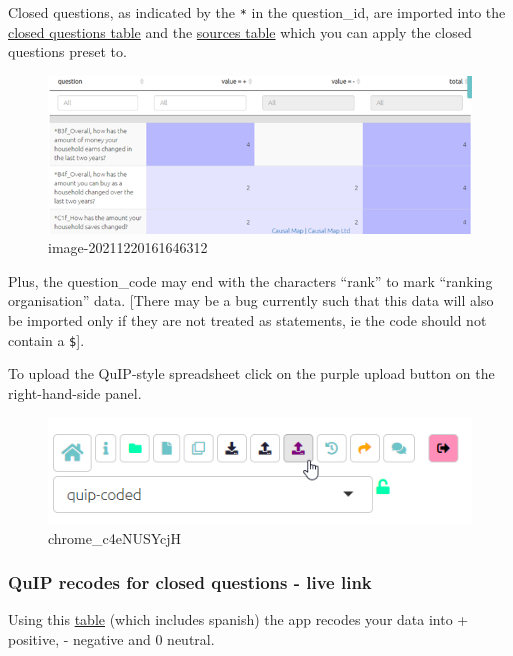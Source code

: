 \documentclass[
]{book}
\begin{document}
Closed questions, as indicated by the \texttt{*} in the question\_id, are imported into the \protect\hyperlink{xthe-closed-question-blocks-table}{closed questions table} and the \protect\hyperlink{xthe-sources-table}{sources table} which you can apply the closed questions preset to.

\begin{figure}
\centering
\includegraphics[width=6.77083in,height=\textheight]{_assets/image-20211220161646312.png}
\caption{image-20211220161646312}
\end{figure}

Plus, the question\_code may end with the characters ``rank'' to mark ``ranking organisation'' data. {[}There may be a bug currently such that this data will also be imported only if they are not treated as statements, ie the code should not contain a \texttt{\$}{]}.

To upload the QuIP-style spreadsheet click on the purple upload button on the right-hand-side panel.

\begin{figure}
\centering
\includegraphics[width=6.77083in,height=\textheight]{_assets/chrome_c4eNUSYcjH.png}
\caption{chrome\_c4eNUSYcjH}
\end{figure}

\hypertarget{quip-recodes-for-closed-questions---live-link}{%
\subsubsection{QuIP recodes for closed questions - live link}\label{quip-recodes-for-closed-questions---live-link}}

Using this \href{https://www.dropbox.com/s/spiacrl67lqwvc9/quip-recodes.xlsx?dl=0}{table} (which includes spanish) the app recodes your data into + positive, - negative and 0 neutral.
\end{document}
